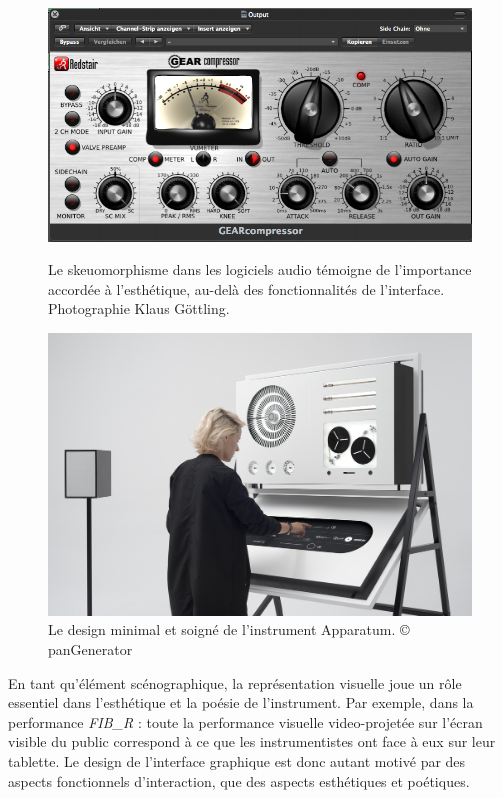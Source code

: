 \begin{figure}[!htbp]
	\captionsetup{format=plain}%
	\centering
	\begin{minipage}[t]{0.48\textwidth}
		\includegraphics[width=\linewidth]{gfx/06_visual_representation/Redstair_GEARcompressor.png}
		\caption[Skeuomorphisme dans les logiciels audio]{Le skeuomorphisme dans les logiciels audio témoigne de l'importance accordée à l'esthétique, au-delà des fonctionnalités de l'interface. Photographie Klaus Göttling.}
		\label{fig:visual_representation:skeuomorphisme}
	\end{minipage}
	\hspace{.02\linewidth}
	\begin{minipage}[t]{0.48\textwidth}
	    \includegraphics[width=\linewidth]{gfx/06_visual_representation/2018_06_26_PAN_GENERATOR_APPARATUM0396.jpg}
		\caption[Apparatum, par panGenerator]{Le design minimal et soigné de l'instrument Apparatum. © panGenerator}
		\label{fig:visual_representation:apparatum}
	\end{minipage}
\end{figure}
\noindent En tant qu'élément scénographique, la représentation visuelle joue un rôle essentiel dans l'esthétique et la poésie de l'instrument. Par exemple, dans la performance \textit{FIB\_R} : toute la performance visuelle video-projetée sur l'écran visible du public correspond à ce que les instrumentistes ont face à eux sur leur tablette. Le design de l'interface graphique est donc autant motivé par des aspects fonctionnels d'interaction, que des aspects esthétiques et poétiques.


